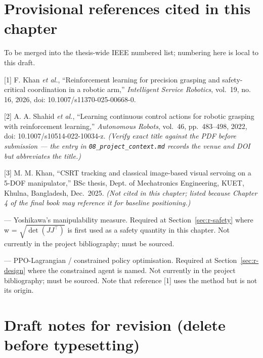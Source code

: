 
\begin{draftonly}
\section*{Provisional references cited in this chapter}\label{provisional-references-cited-in-this-chapter}

To be merged into the thesis-wide IEEE numbered list; numbering here is local to this draft.

{[}1{]} F. Khan \emph{et al.}, ``Reinforcement learning for precision grasping and safety-critical
coordination in a robotic arm,'' \emph{Intelligent Service Robotics}, vol.~19, no. 16, 2026,
doi: 10.1007/s11370-025-00668-0.

{[}2{]} A. A. Shahid \emph{et al.}, ``Learning continuous control actions for robotic grasping with
reinforcement learning,'' \emph{Autonomous Robots}, vol.~46, pp.~483--498, 2022,
doi: 10.1007/s10514-022-10034-z. \emph{(Verify exact title against the PDF before submission --- the
entry in \texttt{08\_project\_context.md} records the venue and DOI but abbreviates the title.)}

{[}3{]} M. M. Khan, ``CSRT tracking and classical image-based visual servoing on a 5-DOF manipulator,''
BSc thesis, Dept. of Mechatronics Engineering, KUET, Khulna, Bangladesh, Dec.~2025. \emph{(Not cited in
this chapter; listed because Chapter 4 of the final book may reference it for baseline
positioning.)}

\textbf{} --- Yoshikawa's manipulability measure. Required at Section~\ref{sec:r-safety} where w = \(\sqrt{\det(JJ^{\top})}\)
is first used as a safety quantity in this chapter. Not currently in the project bibliography;
must be sourced.

\textbf{} --- PPO-Lagrangian / constrained policy optimisation. Required at Section~\ref{sec:r-design} where
the constrained agent is named. Not currently in the project bibliography; must be sourced. Note
that reference {[}1{]} uses the method but is not its origin.


\section*{Draft notes for revision (delete before typesetting)}\label{draft-notes-for-revision-delete-before-typesetting}


\end{draftonly}
